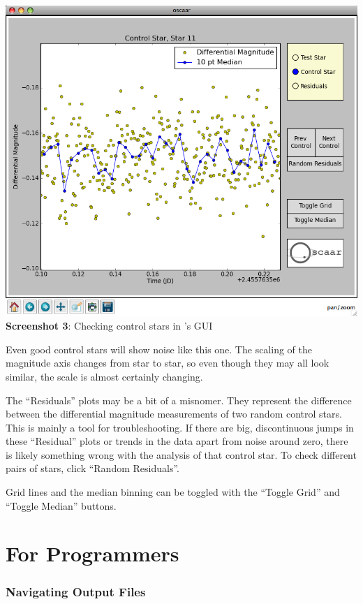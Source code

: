 \documentclass{article}
\begin{document}
\begin{center}
\includegraphics[scale=0.4]{imgs/gui2.png}
{\small \textbf{Screenshot 3}: Checking control stars in \oscaar 's GUI }
\end{center}
\bigskip

Even good control stars will show noise like this one. The scaling of the magnitude axis changes from star to star, so even though they may all look similar, the scale is almost certainly changing. 

The ``Residuals'' plots may be a bit of a misnomer. They represent the difference between the differential magnitude measurements of two random control stars. This is mainly a tool for troubleshooting. If there are big, discontinuous jumps in these ``Residual'' plots or trends in the data apart from noise around zero, there is likely something wrong with the analysis of that control star. To check different pairs of stars, click ``Random Residuals''. 

Grid lines and the median binning can be toggled with the ``Toggle Grid'' and ``Toggle Median'' buttons. 


\section{\oscaar For Programmers} \label{sec:api}

\subsubsection{Navigating \oscaar  Output Files}
\end{document}

